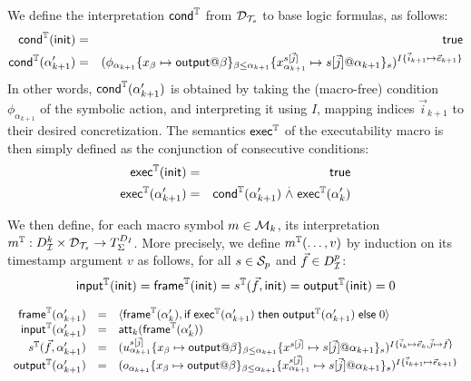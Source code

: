 We define the interpretation $\textsf{cond}^{\mathbb{T}}$ from $\mathcal{D}_{\mathcal{T}_s}$
to base logic formulas, as follows:
\begin{eqnarray*}
  \mcond^\TM(\tinit) &=& \true \\
  \mcond^\TM(\alpha'_{k+1}) &=&
    \interp{\phi_{\alpha_{k+1}}
    \{x_\beta\mapsto\mout@\beta\}_{\beta\leq \alpha_{k+1}}
    \{x_{\alpha_{k+1}}^{s[\vec{j}]}\mapsto
      s[\vec{j}]@\alpha_{k+1}\}_s
    }^{I\{\vec{i}_{k+1}\mapsto\vec{e}_{k+1}\}}
\end{eqnarray*}
In other words, $\textsf{cond}^{\mathbb{T}}(\alpha'_{k+1})$ is obtained by taking the
(macro-free) condition $\phi_{\alpha_{k+1}}$ of the symbolic action, and
interpreting it using $I$, mapping indices $\vec{i}_{k+1}$ to their
desired concretization.
The semantics $\textsf{exec}^{\mathbb{T}}$ of the executability macro is then simply defined as
the conjunction of consecutive conditions:
\begin{eqnarray*}
  \textsf{exec}^{\mathbb{T}}(\mathsf{init}) &=& \textsf{true} \\
  \textsf{exec}^{\mathbb{T}}(\alpha'_{k+1}) &=&
    \textsf{cond}^{\mathbb{T}}(\alpha'_{k+1})
    \stackrel{.}{\wedge}
    \textsf{exec}^{\mathbb{T}}(\alpha'_k)
\end{eqnarray*}

We then define, for each macro symbol $m\in\mathcal{M}_k$,
its interpretation $m^{\mathbb{T}} : D_{\mathcal{I}}^k \times \mathcal{D}_{\mathcal{T}_s} \to T_\Sigma^{D_I}$.
More precisely, we define $m^{\mathbb{T}}(\ldots,v)$ by induction on its timestamp
argument $v$ as follows, for all $s \in \mathcal{S}_p$ and $\vec{f} \in D_{\mathcal{I}}^p$:
\[
    \textsf{input}^{\mathbb{T}}(\mathsf{init}) = \textsf{frame}^{\mathbb{T}}(\mathsf{init}) = s^{\mathbb{T}}(\vec{f},\mathsf{init})
    = \textsf{output}^{\mathbb{T}}(\mathsf{init}) = 0\]


\[\begin{array}{rll}
    \mframe^\TM(\alpha'_{k+1}) &=&
    \langle \mframe^\TM(\alpha'_k),
    \myif \mexec^\TM(\alpha'_{k+1}) \mythen \mout^\TM(\alpha'_{k+1}) \myelse 0
    \rangle
    \\
    \minp^\TM(\alpha'_{k+1}) &=&
    \att_{k}(\mframe^\TM(\alpha'_k))
  \\
    s^\TM(\vec{f},\alpha'_{k+1}) &=&
    \interp{
      u_{\alpha_{k+1}}^{s[\vec{j}]}
      \{x_\beta\mapsto\mout@\beta\}_{\beta\leq \alpha_{k+1}}
      \{x^{s[\vec{j}]}\mapsto
        s[\vec{j}]@\alpha_{k+1}\}_s
    }^{
      I\{\vec{i}_k\mapsto\vec{e}_k,\vec{j}\mapsto\vec{f}\}}
  \\
    \mout^\TM(\alpha'_{k+1}) &=&
      \interp{
        o_{\alpha_{k+1}}
        \{x_\beta\mapsto\mout@\beta\}_{\beta\leq \alpha_{k+1}}
        \{x_{\alpha_{k+1}}^{s[\vec{j}]}\mapsto
          s[\vec{j}]@\alpha_{k+1}\}_s
        }^{I\{\vec{i}_{k+1}\mapsto\vec{e}_{k+1}\}}
\end{array}\]

